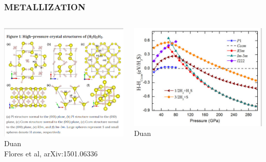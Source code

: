 \documentclass[amssymb,amsmath]{beamer}
\begin{document}
\begin{frame}
\frametitle{METALLIZATION}
\begin{columns}\begin{column}{0.5\textwidth}
\includegraphics[scale=0.3]{./figures/structures_duan.png} \\
Duan\\[1cm]
\hspace{1cm} Flores et al, arXiv:1501.06336
\end{column}
\begin{column}{0.5\textwidth}
\includegraphics[scale=0.27]{./figures/enthalpy_duan.png} Duan\\

\end{column}
\end{columns}
\end{frame}
\end{document}
